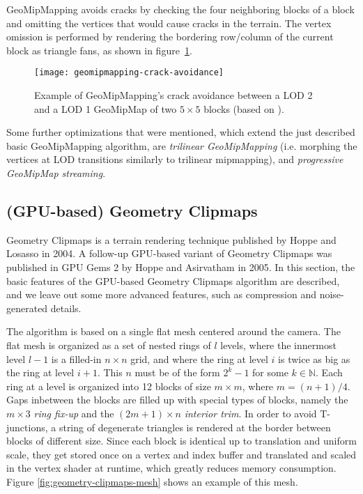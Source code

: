 GeoMipMapping avoids cracks by checking the four neighboring blocks
of a block and omitting the vertices that would cause cracks in the terrain.
The vertex omission is performed by rendering the bordering row/column of the current block
as triangle fans, as shown in figure~\ref{fig:geomipmapping-crack-avoidance}.

\begin{figure}[H]
  \centering
  \texttt{[image: geomipmapping-crack-avoidance]}
  \caption{Example of GeoMipMapping's crack avoidance between a LOD 2 and a LOD 1 GeoMipMap of two $5 \times 5$ blocks (based on \cite{geomipmapping}).}\label{fig:geomipmapping-crack-avoidance}
\end{figure}

Some further optimizations that were mentioned, which extend the just described basic GeoMipMapping algorithm, 
are \textit{trilinear GeoMipMapping} (i.e. morphing the vertices at LOD transitions similarly to trilinear mipmapping),
and \textit{progressive GeoMipMap streaming}.

\subsection{(GPU-based) Geometry Clipmaps}
Geometry Clipmaps \cite{geomclipmaps} is a terrain rendering technique published by Hoppe and Losasso in 2004.
A follow-up GPU-based variant of Geometry Clipmaps \cite{gpugeomclipmaps} was published in GPU Gems 2 by Hoppe and Asirvatham in 2005.
In this section, the basic features of the GPU-based Geometry Clipmaps algorithm are described,
and we leave out some more advanced features, such as compression and noise-generated details.

The algorithm is based on a single flat mesh centered around the camera.
The flat mesh is organized as a set of nested rings of $l$ levels, 
where the innermost level $l-1$ is a filled-in $n \times n$ grid, and where the ring at level $i$ is twice as big as the ring 
at level $i + 1$. This $n$ must be of the form $2^k - 1$ for some $k \in \mathbb{N}$. 
Each ring at a level is organized into 12 blocks of size $m \times m$, where $m = (n+1)/4$.
Gaps inbetween the blocks are filled up with special types of blocks, namely the $m \times 3$ \textit{ring fix-up} and the $(2m+1) \times n$ \textit{interior trim}.
In order to avoid T-junctions, a string of degenerate triangles is rendered at the border between blocks of 
different size. Since each block is identical up to translation and uniform scale, they get stored once on a vertex and index buffer 
and translated and scaled in the vertex shader at runtime, which greatly reduces memory consumption.
Figure \ref{fig:geometry-clipmaps-mesh} shows an example of this mesh. 

